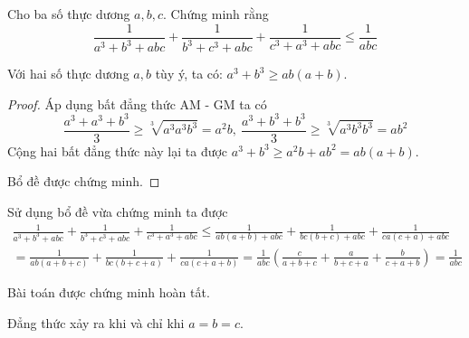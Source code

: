 \begin{problem}

Cho ba số thực dương $a, b, c$. Chứng minh rằng
\[
	\frac{1}{a^3 + b^3 + abc} + \frac{1}{b^3 + c^3 + abc} + \frac{1}{c^3 + a^3 + abc} \le \frac{1}{abc}
\]

\solution

\begin{mybox}
\begin{lemma}
Với hai số thực dương $a, b$ tùy ý, ta có: $a^3 + b^3 \ge ab(a + b)$.	
\end{lemma}

\begin{proof}
Áp dụng bất đẳng thức AM - GM ta có
\[
	\frac{a^3 + a^3 + b^3}{3} \ge \sqrt[3]{a^3 a^3 b^3} = a^2b,\ \frac{a^3 + b^3 + b^3}{3} \ge \sqrt[3]{a^3 b^3 b^3} = ab^2 
\]
Cộng hai bất đẳng thức này lại ta được $a^3 + b^3 \ge a^2b + ab^2 = ab(a + b)$.

Bổ đề được chứng minh.
\end{proof}
\end{mybox}

Sử dụng bổ đề vừa chứng minh ta được
\begin{align*}
	\frac{1}{a^3 + b^3 + abc} + \frac{1}{b^3 + c^3 + abc} + \frac{1}{c^3 + a^3 + abc} \le
	\frac{1}{ab(a + b) + abc} + \frac{1}{bc(b + c) + abc} + \frac{1}{ca(c + a) + abc} \\ 
	= \frac{1}{ab(a + b + c)} + \frac{1}{bc(b + c + a)} + \frac{1}{ca(c + a + b)} =
	\frac{1}{abc}\left(\frac{c}{a + b + c} + \frac{a}{b + c + a} + \frac{b}{c + a + b}\right) = \frac{1}{abc}
\end{align*}

Bài toán được chứng minh hoàn tất.

Đẳng thức xảy ra khi và chỉ khi $a = b = c$.

\end{problem}
